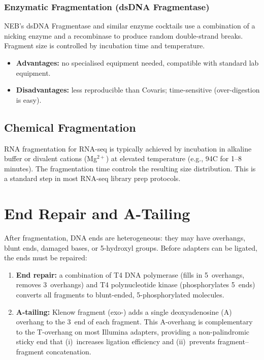 \subsubsection{Enzymatic Fragmentation (dsDNA Fragmentase)}

NEB's dsDNA Fragmentase and similar enzyme cocktails use a combination of a nicking enzyme and a recombinase to produce random double-strand breaks. Fragment size is controlled by incubation time and temperature.

\begin{itemize}[nosep]
  \item \textbf{Advantages:} no specialised equipment needed, compatible with standard lab equipment.
  \item \textbf{Disadvantages:} less reproducible than Covaris; time-sensitive (over-digestion is easy).
\end{itemize}

\subsection{Chemical Fragmentation}

RNA fragmentation for \gls{RNA-seq} is typically achieved by incubation in alkaline buffer or divalent cations (Mg$^{2+}$) at elevated temperature (e.g., 94\textdegree C for 1--8 minutes). The fragmentation time controls the resulting size distribution. This is a standard step in most RNA-seq library prep protocols.


\section{End Repair and A-Tailing}
\label{sec:endrepair}

After fragmentation, DNA ends are heterogeneous: they may have overhangs, blunt ends, damaged bases, or 5\textquotesingle-hydroxyl groups. Before adapters can be ligated, the ends must be repaired:

\begin{enumerate}[nosep]
  \item \textbf{End repair:} a combination of T4 DNA polymerase (fills in 5\textquotesingle\ overhangs, removes 3\textquotesingle\ overhangs) and T4 polynucleotide kinase (phosphorylates 5\textquotesingle\ ends) converts all fragments to blunt-ended, 5\textquotesingle-phosphorylated molecules.

  \item \textbf{A-tailing:} Klenow fragment (exo-) adds a single deoxyadenosine (A) overhang to the 3\textquotesingle\ end of each fragment. This A-overhang is complementary to the T-overhang on most Illumina adapters, providing a non-palindromic sticky end that (i)~increases ligation efficiency and (ii)~prevents fragment--fragment concatenation.
\end{enumerate}

